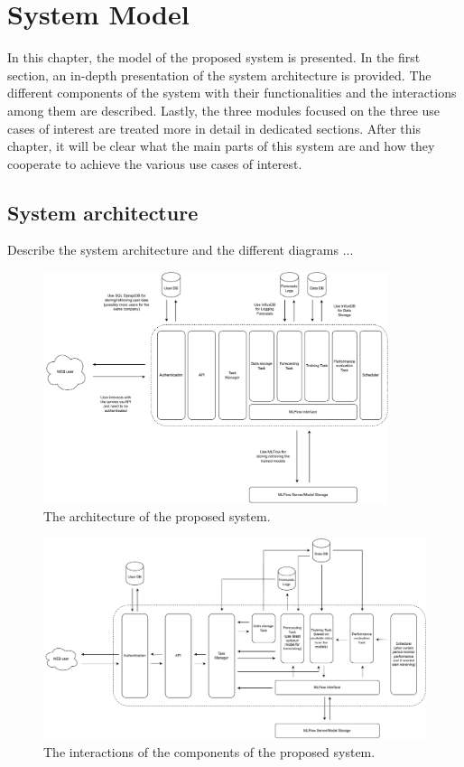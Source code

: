 \chapter{System Model}
\label{cha:system}
\vspace{0.4 cm}

In this chapter, the model of the proposed system is presented.
In the first section, an in-depth presentation of the system architecture is provided.
The different components of the system with their functionalities and the interactions among them are described.
Lastly, the three modules focused on the three use cases of interest are treated more in detail in dedicated sections.
After this chapter, it will be clear what the main parts of this system are and how they cooperate to achieve the various use cases of interest.


\section{System architecture}
\label{sec:architecture}
\vspace{0.2 cm}

Describe the system architecture and the different diagrams ...

\begin{figure}[H]
\centering 
\includegraphics[width=0.9\textwidth]{images/architecture_components} 
\caption{The architecture of the proposed system.}
\label{fig:components}
\end{figure}

\begin{figure}[H]
\centering 
\includegraphics[width=1\textwidth]{images/architecture_interactions} 
\caption{The interactions of the components of the proposed system.}
\label{fig:interactions}
\end{figure}

